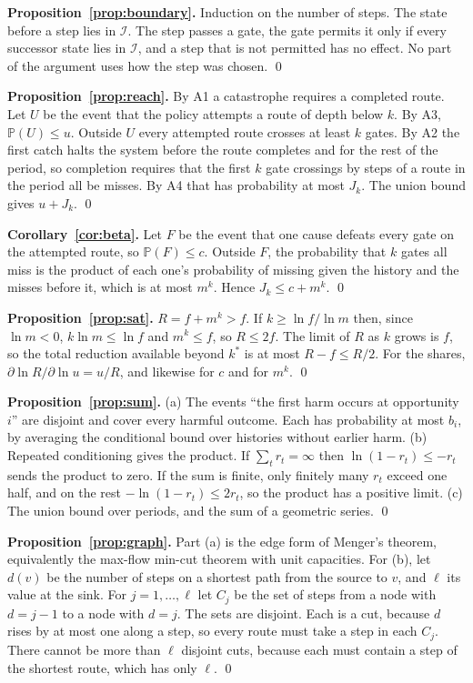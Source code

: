 \documentclass[10pt,twocolumn]{article}
\theoremstyle{plain}
\theoremstyle{definition}
\newcommand{\Pb}{\mathbb{P}}
\newcommand{\para}[1]{\smallskip\noindent\textbf{#1}\enspace}
\begin{document}
\para{Proposition~\ref{prop:boundary}.} Induction on the number of steps. The state before a
step lies in $\mathcal{I}$. The step passes a gate, the gate permits it only if every
successor state lies in $\mathcal{I}$, and a step that is not permitted has no effect. No part
of the argument uses how the step was chosen. \qed

\para{Proposition~\ref{prop:reach}.} By A1 a catastrophe requires a completed route. Let $U$ be the event that the policy attempts a route of depth below $k$. By A3, $\Pb(U)\le u$. Outside $U$ every attempted route crosses at least $k$ gates. By A2 the
first catch halts the system before the route completes and for the rest of the period, so
completion requires that the first $k$ gate crossings by steps of a route in the period all
be misses. By A4 that has probability at most $J_{k}$. The union bound gives $u+J_{k}$. \qed

\para{Corollary~\ref{cor:beta}.} Let $F$ be the event that one cause defeats every gate on
the attempted route, so $\Pb(F)\le c$. Outside $F$, the probability that $k$ gates all miss is
the product of each one's probability of missing given the history and the misses before it,
which is at most $m^{k}$. Hence $J_{k}\le c+m^{k}$. \qed

\para{Proposition~\ref{prop:sat}.} $R=f+m^{k}>f$. If $k\ge \ln f/\ln m$ then, since
$\ln m<0$, $k\ln m\le \ln f$ and $m^{k}\le f$, so $R\le 2f$. The limit of $R$ as $k$ grows is
$f$, so the total reduction available beyond $k^{*}$ is at most $R-f\le R/2$. For the shares,
$\partial \ln R/\partial \ln u=u/R$, and likewise for $c$ and for $m^{k}$. \qed

\para{Proposition~\ref{prop:sum}.} (a) The events ``the first harm occurs at opportunity
$i$'' are disjoint and cover every harmful outcome. Each has probability at most $b_{i}$, by
averaging the conditional bound over histories without earlier harm. (b) Repeated
conditioning gives the product. If $\sum_{t}r_{t}=\infty$ then $\ln(1-r_{t})\le-r_{t}$ sends
the product to zero. If the sum is finite, only finitely many $r_{t}$ exceed one half, and on
the rest $-\ln(1-r_{t})\le 2r_{t}$, so the product has a positive limit. (c) The union bound
over periods, and the sum of a geometric series. \qed

\para{Proposition~\ref{prop:graph}.} Part (a) is the edge form of Menger's theorem,
equivalently the max-flow min-cut theorem with unit capacities. For (b), let $d(v)$ be the
number of steps on a shortest path from the source to $v$, and $\ell$ its value at the sink.
For $j=1,\dots,\ell$ let $C_{j}$ be the set of steps from a node with $d=j-1$ to a node with
$d=j$. The sets are disjoint. Each is a cut, because $d$ rises by at most one along a step,
so every route must take a step in each $C_{j}$. There cannot be more than $\ell$ disjoint
cuts, because each must contain a step of the shortest route, which has only $\ell$. \qed
\end{document}
